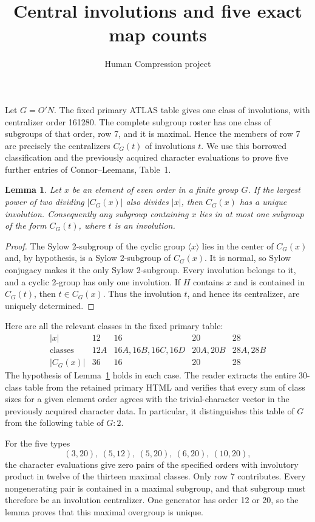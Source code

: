 \documentclass[11pt,a4paper]{article}
\title{Central involutions and five exact map counts}
\author{Human Compression project}\date{}
\newtheorem{lemma}{Lemma}
\begin{document}
\maketitle
Let $G=O'N$. The fixed primary ATLAS table gives one class of
involutions, with centralizer order 161280. The complete subgroup
roster has one class of subgroups of that order, row 7, and it is
maximal. Hence the members of row 7 are precisely the centralizers
$C_G(t)$ of involutions $t$. We use this borrowed classification
and the previously acquired character evaluations to prove five
further entries of Connor--Leemans, Table~1.

\begin{lemma}\label{unique}
Let $x$ be an element of even order in a finite group $G$.
If the largest power of two dividing $|C_G(x)|$ also divides $|x|$,
then $C_G(x)$ has a unique involution. Consequently any subgroup
containing $x$ lies in at most one subgroup of the form $C_G(t)$,
where $t$ is an involution.
\end{lemma}
\begin{proof}
The Sylow 2-subgroup of the cyclic group $\langle x\rangle$ lies
in the center of $C_G(x)$ and, by hypothesis, is a Sylow 2-subgroup
of $C_G(x)$. It is normal, so Sylow conjugacy makes it the only
Sylow 2-subgroup. Every involution belongs to it, and a cyclic
2-group has only one involution. If $H$ contains $x$ and is contained
in $C_G(t)$, then $t\in C_G(x)$. Thus the involution $t$, and hence
its centralizer, are uniquely determined.
\end{proof}

Here are all the relevant classes in the fixed primary table:
\[
\begin{array}{c|rrrr}
|x|&12&16&20&28\\\hline
\text{classes}&12A&16A,16B,16C,16D&20A,20B&28A,28B\\
|C_G(x)|&36&16&20&28
\end{array}
\]
The hypothesis of Lemma~\ref{unique} holds in each case. The
reader extracts the entire 30-class table from the retained primary
HTML and verifies that every sum of class sizes for a given element
order agrees with the trivial-character vector in the previously
acquired character data. In particular, it distinguishes this table
of $G$ from the following table of $G:2$.

For the five types
\[
          (3,20),\ (5,12),\ (5,20),\ (6,20),\ (10,20),
\]
the character evaluations give zero pairs of the specified orders
with involutory product in twelve of the thirteen maximal classes.
Only row 7 contributes. Every nongenerating pair is contained in a
maximal subgroup, and that subgroup must therefore be an involution
centralizer. One generator has order 12 or 20, so the lemma proves
that this maximal overgroup is unique.
\end{document}
